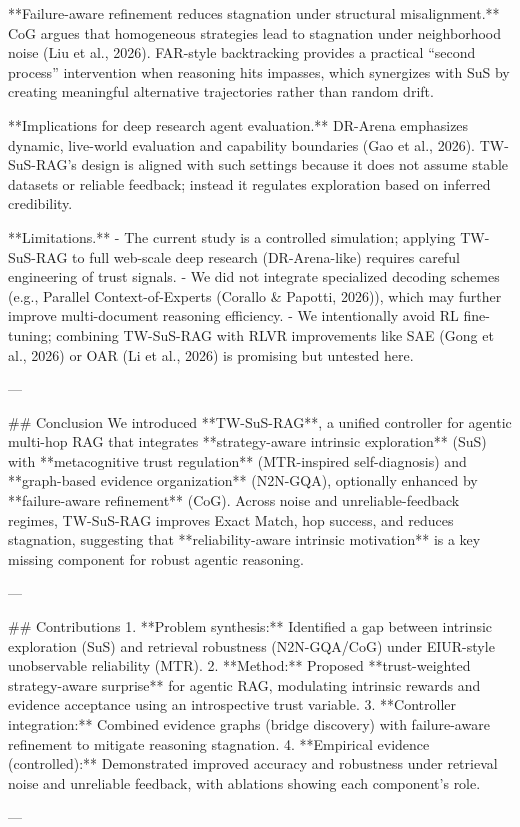 **Failure-aware refinement reduces stagnation under structural misalignment.** CoG argues that homogeneous strategies lead to stagnation under neighborhood noise (Liu et al., 2026). FAR-style backtracking provides a practical “second process” intervention when reasoning hits impasses, which synergizes with SuS by creating meaningful alternative trajectories rather than random drift.

**Implications for deep research agent evaluation.** DR-Arena emphasizes dynamic, live-world evaluation and capability boundaries (Gao et al., 2026). TW-SuS-RAG’s design is aligned with such settings because it does not assume stable datasets or reliable feedback; instead it regulates exploration based on inferred credibility.

**Limitations.**  
- The current study is a controlled simulation; applying TW-SuS-RAG to full web-scale deep research (DR-Arena-like) requires careful engineering of trust signals.  
- We did not integrate specialized decoding schemes (e.g., Parallel Context-of-Experts (Corallo & Papotti, 2026)), which may further improve multi-document reasoning efficiency.  
- We intentionally avoid RL fine-tuning; combining TW-SuS-RAG with RLVR improvements like SAE (Gong et al., 2026) or OAR (Li et al., 2026) is promising but untested here.

---

## Conclusion  
We introduced **TW-SuS-RAG**, a unified controller for agentic multi-hop RAG that integrates **strategy-aware intrinsic exploration** (SuS) with **metacognitive trust regulation** (MTR-inspired self-diagnosis) and **graph-based evidence organization** (N2N-GQA), optionally enhanced by **failure-aware refinement** (CoG). Across noise and unreliable-feedback regimes, TW-SuS-RAG improves Exact Match, hop success, and reduces stagnation, suggesting that **reliability-aware intrinsic motivation** is a key missing component for robust agentic reasoning.

---

## Contributions  
1. **Problem synthesis:** Identified a gap between intrinsic exploration (SuS) and retrieval robustness (N2N-GQA/CoG) under EIUR-style unobservable reliability (MTR).  
2. **Method:** Proposed **trust-weighted strategy-aware surprise** for agentic RAG, modulating intrinsic rewards and evidence acceptance using an introspective trust variable.  
3. **Controller integration:** Combined evidence graphs (bridge discovery) with failure-aware refinement to mitigate reasoning stagnation.  
4. **Empirical evidence (controlled):** Demonstrated improved accuracy and robustness under retrieval noise and unreliable feedback, with ablations showing each component’s role.

---